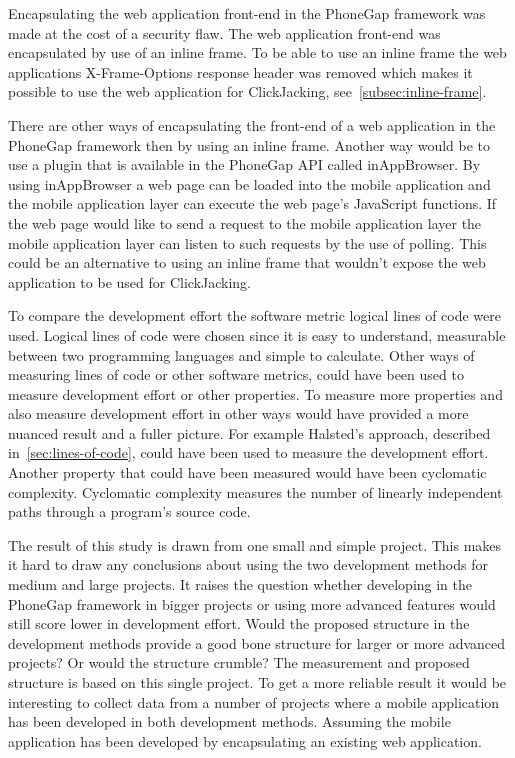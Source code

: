 Encapsulating the web application front-end in the PhoneGap framework was made at the cost of a security flaw. The web application front-end was encapsulated by use of an inline frame. To be able to use an inline frame the web applications X-Frame-Options response header was removed which makes it possible to use the web application for ClickJacking, see~\ref{subsec:inline-frame}. 

There are other ways of encapsulating the front-end of a web application in the PhoneGap framework then by using an inline frame. Another way would be to use a plugin that is available in the PhoneGap API called inAppBrowser. By using inAppBrowser a web page can be loaded into the mobile application and the mobile application layer can execute the web page’s JavaScript functions. If the web page would like to send a request to the mobile application layer the mobile application layer can listen to such requests by the use of polling.  This could be an alternative to using an inline frame that wouldn’t expose the web application to be used for ClickJacking. 

To compare the development effort the software metric logical lines of code were used. Logical lines of code were chosen since it is easy to understand, measurable between two programming languages and simple to calculate. Other ways of measuring lines of code or other software metrics, could have been used to measure development effort or other properties. To measure more properties and also measure development effort in other ways would have provided a more nuanced result and a fuller picture. For example Halsted's approach, described in~\ref{sec:lines-of-code}, could have been used to measure the development effort. Another property that could have been measured would have been cyclomatic complexity. Cyclomatic complexity measures the number of linearly independent paths through a program’s source code. 

The result of this study is drawn from one small and simple project. This makes it hard to draw any conclusions about using the two development methods for medium and large projects. It raises the question whether developing in the PhoneGap framework in bigger projects or using more advanced features would still score lower in development effort. Would the proposed structure in the development methods provide a good bone structure for larger or more advanced projects? Or would the structure crumble? The measurement and proposed structure is based on this single project. To get a more reliable result it would be interesting to collect data from a number of projects where a mobile application has been developed in both development methods. Assuming the mobile application has been developed by encapsulating an existing web application.  

